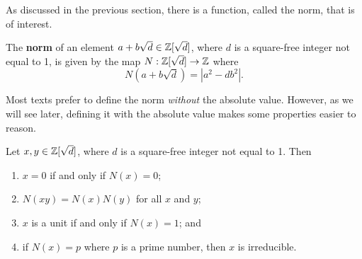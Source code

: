 As discussed in the previous section, there is a function, called the norm, that is of interest.
\begin{definition}
    The \textbf{norm} of an element $a+b\sqrt{d} \in \mathbb{Z}[\sqrt{d}]$, where $d$ is a square-free integer not equal to 1, is given by the map $N: \mathbb{Z}[\sqrt{d}] \to \mathbb{Z}$ where
    \[
        N(a+b\sqrt{d}) = |a^2-db^2|.
    \]
\end{definition}
\begin{remark}
    Most texts prefer to define the norm \textit{without} the absolute value. However, as we will see later, defining it with the absolute value makes some properties easier to reason.
\end{remark}

\begin{proposition}\label{prop-properties-of-quadratic-integer-norm}
    Let $x,y \in \mathbb{Z}[\sqrt{d}]$, where $d$ is a square-free integer not equal to 1. Then
    \begin{enumerate}
        \item $x = 0$ if and only if $N(x) = 0$;
        \item $N(xy) = N(x)N(y)$ for all $x$ and $y$;
        \item $x$ is a unit if and only if $N(x) = 1$; and
        \item if $N(x) = p$ where $p$ is a prime number, then $x$ is irreducible.
    \end{enumerate}
\end{proposition}
